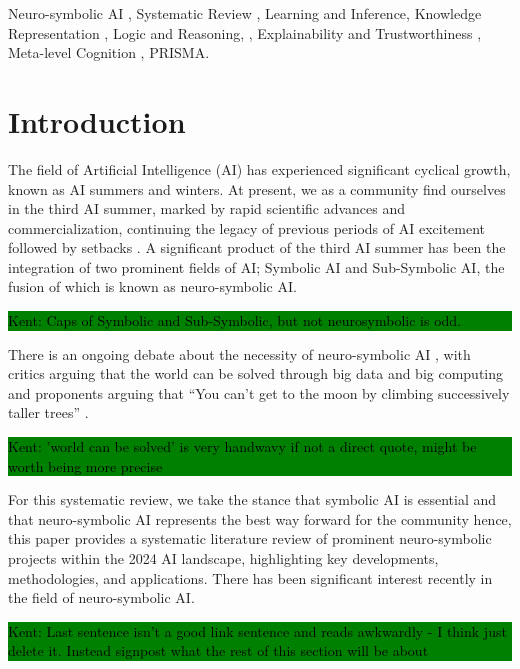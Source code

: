 \documentclass[hf]{ceurart}
\newcommand{\pinaforecomment}[4]{\colorbox{#1}{\textcolor{#4}{\parbox{.8\linewidth}{#2: #3}}}}
\newcommand{\osullikomment}[1]{\pinaforecomment{green}{Kent}{#1}{black}}
\begin{document}
\begin{keywords}
  Neuro-symbolic AI \sep 
  Systematic Review \sep 
  Learning and Inference\sep
  Knowledge Representation \sep
  Logic and Reasoning, \sep
  Explainability and Trustworthiness \sep
  Meta-level Cognition \sep
  PRISMA.
\end{keywords}


\maketitle


\section{Introduction} \label{sec:intro}
The field of Artificial Intelligence (AI) has experienced significant cyclical growth, known as AI summers and winters. At present, we as a community find ourselves in the third AI summer, marked by rapid scientific advances and commercialization, continuing the legacy of previous periods of AI excitement followed by setbacks \cite{Kautz2022}. A significant product of the third AI summer has been the integration of two prominent fields of AI; Symbolic AI and Sub-Symbolic AI, the fusion of which is known as neuro-symbolic AI. 
%
\osullikomment{Caps of Symbolic and Sub-Symbolic, but not neurosymbolic is odd.}
%
There is an ongoing debate about the necessity of neuro-symbolic AI \cite{Dingli2023}, with critics arguing that the world can be solved through big data and big computing and proponents arguing that \enquote{You can’t get to the moon by climbing successively taller trees} \cite{Marcus2019}. 
%
\osullikomment{'world can be solved' is very handwavy if not a direct quote, might be worth being more precise}
%
For this systematic review, we take the stance that symbolic AI is essential and that neuro-symbolic AI represents the best way forward for the community hence, this paper provides a systematic literature review of prominent neuro-symbolic projects within the 2024 AI landscape, highlighting key developments, methodologies, and applications. There has been significant interest recently in the field of neuro-symbolic AI. 
\osullikomment{Last sentence isn't a good link sentence and reads awkwardly - I think just delete it. Instead signpost what the rest of this section will be about}
\end{document}
